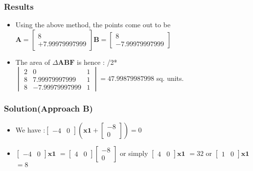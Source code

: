 \documentclass{beamer}
\begin{document}
\begin{frame}
\frametitle{Results}
\begin{itemize}
	\item<1->Using the above method, the points come out to be \newline \newline$\mathbf{A} = \begin{bmatrix} 8 \\ +7.99979997999
	\end{bmatrix} $\newline $\mathbf{B} = \begin{bmatrix} 8 \\ -7.99979997999
	\end{bmatrix}$\newline \newline
	\item<2->The area of $\Delta\mathbf{ABF}$ is hence : \newline {}/2*$\begin{vmatrix}2 & 0 & 1 \\ 8 & 7.99979997999 & 1 \\ 8 & -7.99979997999 & 1
	\end{vmatrix} = 47.99879987998$ sq. units.
\end{itemize}
\end{frame}


\begin{frame}
\frametitle{Solution(Approach B)}
\begin{itemize}
	\item<1-> We have :\newline \newline $\begin{bmatrix} -4 & 0
	\end{bmatrix} (\mathbf{x1} +\begin{bmatrix} -8 \\ 0
	\end{bmatrix} ) = 0 $
	\item<2->  $\begin{bmatrix} -4 & 0
	\end{bmatrix} \mathbf{x1}$  $ = \begin{bmatrix} 4 & 0
	\end{bmatrix} \begin{bmatrix} -8 \\ 0
	\end{bmatrix}$ or simply \newline \newline $\begin{bmatrix} 4 & 0
	\end{bmatrix} \mathbf{x1}$  $ = 32$ \newline
	\newline
	or $\begin{bmatrix} 1 & 0
	\end{bmatrix} \mathbf{x1}$  $ = 8$
\end{itemize}
\end{frame}
\end{document}
